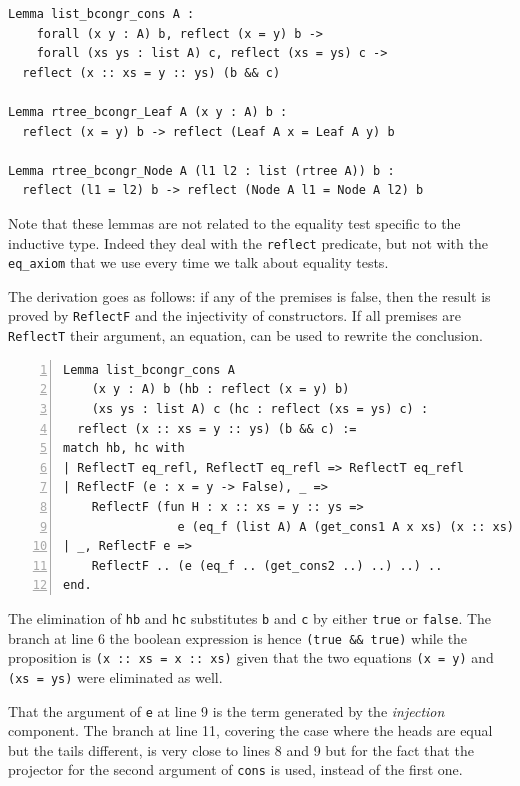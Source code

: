 \documentclass[a4paper,UKenglish,cleveref, autoref]{lipics-v2019}
\newcommand{\derive}[1]{\emph{#1}}
\begin{document}
\begin{lstlisting}
Lemma list_bcongr_cons A :
    forall (x y : A) b, reflect (x = y) b ->
    forall (xs ys : list A) c, reflect (xs = ys) c ->
  reflect (x :: xs = y :: ys) (b && c)

Lemma rtree_bcongr_Leaf A (x y : A) b :
  reflect (x = y) b -> reflect (Leaf A x = Leaf A y) b

Lemma rtree_bcongr_Node A (l1 l2 : list (rtree A)) b :
  reflect (l1 = l2) b -> reflect (Node A l1 = Node A l2) b
\end{lstlisting}

\noindent
Note that these lemmas are not related to the
equality test specific to the inductive type. Indeed they deal
with the \lstinline+reflect+ predicate, but not with the
\lstinline+eq_axiom+ that we use every time we talk about equality tests.

The derivation goes as follows: if any of the premises
is false, then the result is proved by
\lstinline+ReflectF+ and the injectivity of constructors.
If all premises are \lstinline+ReflectT+ their argument,
an equation, can be used to rewrite the conclusion.

\begin{lstlisting}[numbers=left]
Lemma list_bcongr_cons A 
    (x y : A) b (hb : reflect (x = y) b)
    (xs ys : list A) c (hc : reflect (xs = ys) c) :
  reflect (x :: xs = y :: ys) (b && c) :=
match hb, hc with
| ReflectT eq_refl, ReflectT eq_refl => ReflectT eq_refl
| ReflectF (e : x = y -> False), _ =>
    ReflectF (fun H : x :: xs = y :: ys =>
                e (eq_f (list A) A (get_cons1 A x xs) (x :: xs) (y :: ys) H))
| _, ReflectF e =>
    ReflectF .. (e (eq_f .. (get_cons2 ..) ..) ..) ..
end.
\end{lstlisting}

\noindent
The elimination of \lstinline+hb+ and \lstinline+hc+
substitutes \lstinline+b+ and \lstinline+c+ 
by either \lstinline+true+ or \lstinline+false+. The branch
at line 6 the boolean expression is hence \lstinline+(true && true)+
while the proposition is \lstinline+(x :: xs = x :: xs)+ given that
the two equations \lstinline+(x = y)+ and \lstinline+(xs = ys)+
were eliminated as well.

That the argument of \lstinline+e+ at line 9
is the term generated by the \derive{injection} component.
The branch at line 11, covering the case where
the heads are equal but the tails different, is very close
to lines 8 and 9 but for the fact that the projector for
the second argument of \lstinline+cons+ is used, instead of the
first one.
\end{document}
